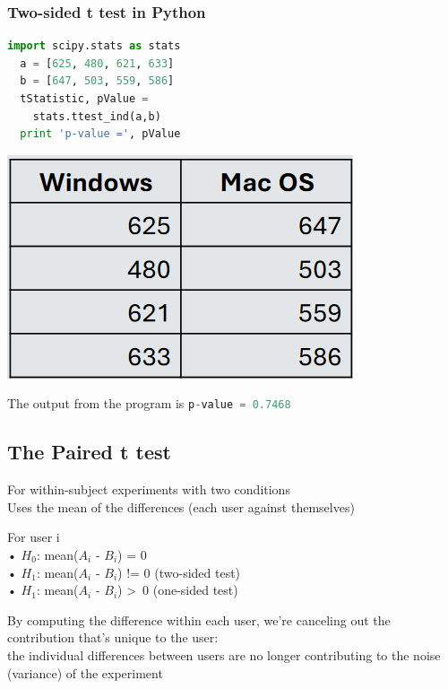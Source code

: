 \documentclass[]{project_plan}
\begin{document}
\subsubsection{Two-sided t test in Python}

\begin{minipage}{0.6\linewidth}
  \begin{lstlisting}[language=Python]
  import scipy.stats as stats
  a = [625, 480, 621, 633]
  b = [647, 503, 559, 586]
  tStatistic, pValue =
    stats.ttest_ind(a,b)
  print 'p-value =', pValue
  \end{lstlisting}
\end{minipage}
\hfill
\begin{minipage}{0.3\linewidth}
  \includegraphics[width=\linewidth]{python_t_test.png}
\end{minipage}

The output from the program is \lstinline[language=Python]|p-value = 0.7468|

\subsection{The Paired t test}

For within-subject experiments with two conditions\\
Uses the mean of the differences (each user against themselves)

For user i\\
• $H_0$: mean($A_i$ - $B_i$) = 0\\
• $H_1$: mean($A_i$ - $B_i$) != 0 (two-sided test)\\
• $H_1$: mean($A_i$ - $B_i$) \textgreater \ 0 (one-sided test)

By computing the difference within each user, we’re
canceling out the contribution that’s unique to the user:\\
the individual differences between users are no longer
contributing to the noise (variance) of the experiment
\end{document}
